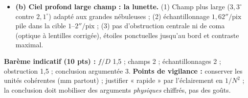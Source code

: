 \documentclass[11pt]{article}
\begin{document}
\begin{corrige}
\begin{enumerate}
\begin{itemize}
        \item \textbf{(b) Ciel profond large champ : la lunette.} (1) Champ plus large ($3,3^\circ$ contre $2,1^\circ$) adapté aux grandes nébuleuses ; (2) échantillonnage $1,62''/\text{pix}$ pile dans la cible $1$--$2''/\text{pix}$ ; (3) pas d'obstruction centrale ni de coma (optique à lentilles corrigée), étoiles ponctuelles jusqu'au bord et contraste maximal.
    \end{itemize}
\end{enumerate}
\textbf{Barème indicatif (10 pts) :} $f/D$ 1,5 ; champs 2 ; échantillonnages 2 ; obstruction 1,5 ; conclusion argumentée 3.
\textbf{Points de vigilance :} conserver les unités cohérentes (mm partout) ; justifier « rapide » par l'éclairement en $1/N^2$ ; la conclusion doit mobiliser des arguments \emph{physiques} chiffrés, pas des goûts.
\end{corrige}
\end{document}
